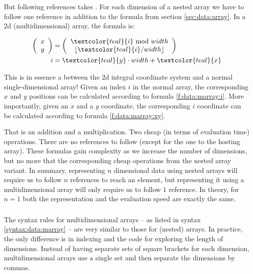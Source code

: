 But following references takes . For each dimension of a nested array we have to follow one reference in addition to the formula from section \ref{sec:data:array}. In a 2d (multidimensional) array, the formula is:

\begin{alignat}{1}
  \label{f:data:marray:i}
  \left(
    \begin{array}{c}
      x \\
      y
    \end{array}
  \right)
  &= 
  \left(
    \begin{array}{c}
      \textcolor{teal}{i} ~\mathrm{mod}~ width \\
      \lfloor \textcolor{teal}{i} / width \rfloor
    \end{array}
  \right)
  \\
  \label{f:data:marray:xy}
  i &= \textcolor{teal}{y} \cdot width + \textcolor{teal}{x}
\end{alignat}

This is in essence a  between the 2d integral coordinate system and a normal single-dimensional array! Given an index $i$ in the normal array, the corresponding $x$ and $y$ positions can be calculated according to formula \ref{f:data:marray:i}. More importantly, given an $x$ and a $y$ coordinate, the corresponding $i$ coordinate can be calculated according to formula \ref{f:data:marray:xy}.

That is an addition and a multiplication. Two cheap (in terms of evaluation time) operations. There are no references to follow (except for the one to the hosting array). These formulas gain complexity as we increase the number of dimensions, but no more that the corresponding cheap operations from the nested array variant. In summary, representing $n$ dimensional data using nested arrays will require us to follow $n$ references to reach an element, but representing it using a multidimensional array will only require us to follow $1$ reference. In theory, for $n=1$ both the representation and the evaluation speed are exactly the same.

\subsubsection{\csharp}

The syntax rules for multidimensional arrays -- as listed in syntax \ref{syntax:data:marray} -- are very similar to those for (nested) arrays. In practice, the only difference is in indexing and the code for exploring the length of dimensions. Instead of having separate sets of square brackets for each dimension, multidimensional arrays use a single set and then separate the dimensions by commas.

